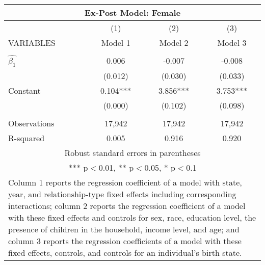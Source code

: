 \begin{tabular}{lccc}
\multicolumn{4}{c}{Ex-Post Model: Female} \\ \hline
 & (1) & (2) & (3) \\
VARIABLES & Model 1 & Model 2 & Model 3 \\ \hline
 &  &  &  \\
$\hat{\beta_1}$ & 0.006 & -0.007 & -0.008 \\
 & (0.012) & (0.030) & (0.033) \\
Constant & 0.104*** & 3.856*** & 3.753*** \\
 & (0.000) & (0.102) & (0.098) \\
 &  &  &  \\
Observations & 17,942 & 17,942 & 17,942 \\
 R-squared & 0.005 & 0.916 & 0.920 \\ \hline
\multicolumn{4}{c}{ Robust standard errors in parentheses} \\
\multicolumn{4}{c}{ *** p$<$0.01, ** p$<$0.05, * p$<$0.1} \\
\multicolumn{4}{p{0.8\linewidth}}{\small Column 1 reports the regression coefficient of a model with state, year, and relationship-type fixed effects including corresponding interactions; column 2 reports the regression coefficient of a model with these fixed effects and controls for sex, race, education level, the presence of children in the household, income level, and age; and column 3 reports the regression coefficients of a model with these fixed effects, controls, and controls for an individual’s birth state.} \\
\end{tabular}
